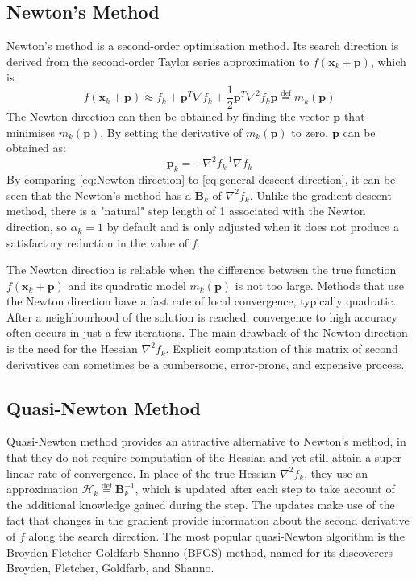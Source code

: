 \subsection{Newton's Method}
Newton's method is a second-order optimisation method. Its search direction is derived from the second-order Taylor series approximation to $f(\textbf{x}_k+\textbf{p})$, which is
\begin{equation}
  f(\textbf{x}_k+\textbf{p}) \approx f_k + \textbf{p}^T \nabla f_k + \frac{1}{2}\textbf{p}^T \nabla^2 f_k \textbf{p} \stackrel{\text{def}}{=}m_k(\textbf{p})
\end{equation}
The Newton direction can then be obtained by finding the vector $\textbf{p}$ that minimises $m_k(\textbf{p})$. By setting the derivative of $m_k(\textbf{p})$ to zero, $\textbf{p}$ can be obtained as:
\begin{equation}
  \textbf{p}_k=-\nabla^2 f_k^{-1}\nabla f_k \label{eq:Newton-direction}
\end{equation}
By comparing \cref{eq:Newton-direction} to \cref{eq:general-descent-direction}, it can be seen that the Newton's method has a $\textbf{B}_k$ of $\nabla^2 f_k$. Unlike the gradient descent method, there is a "natural" step length of 1 associated with the Newton direction, so $\alpha_k = 1$ by default and is only adjusted when it does not produce a satisfactory reduction in the value of $f$.

The Newton direction is reliable when the difference between the true function $f(\textbf{x}_k+\textbf{p})$ and its quadratic model $m_k(\textbf{p})$ is not too large. Methods that use the Newton direction have a fast rate of local convergence, typically quadratic. After a neighbourhood of the solution is reached, convergence to high accuracy often occurs in just a few iterations. The main drawback of the Newton direction is the need for the Hessian $\nabla^2 f_k$. Explicit computation of this matrix of second derivatives can sometimes be a cumbersome, error-prone, and expensive process. \cite{Nocedal2006}


\subsection{Quasi-Newton Method}\label{sec:BFGS}
Quasi-Newton method provides an attractive alternative to Newton's method, in that they do not require computation of the Hessian and yet still attain a super linear rate of convergence. In place of the true Hessian $\nabla^2 f_k$, they use an approximation $\mathcal{H}_k \stackrel{\text{def}}{=} \textbf{B}_k^{-1}$, which is updated after each step to take account of the additional knowledge gained during the step. The updates make use of the fact that changes in the gradient provide information about the second derivative of $f$ along the search direction. The most popular quasi-Newton algorithm is the Broyden-Fletcher-Goldfarb-Shanno (BFGS) method, named for its discoverers Broyden, Fletcher, Goldfarb, and Shanno. \cite{Nocedal2006}

